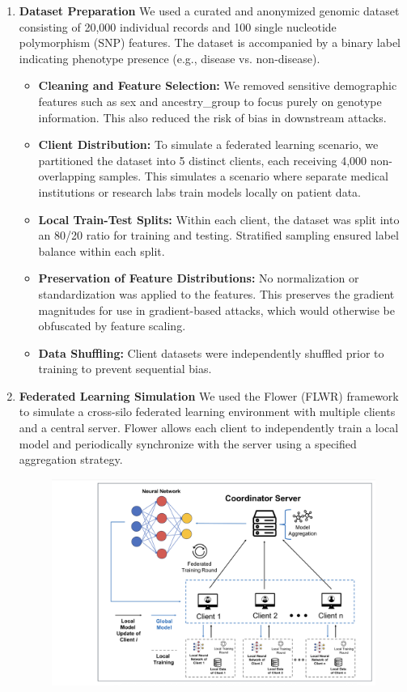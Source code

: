 \documentclass[conference]{IEEEtran}
\begin{document}
\begin{enumerate}
    \item \textbf{Dataset Preparation} 
    \newline
    We used a curated and anonymized genomic dataset consisting of 20,000 individual records and 100 single nucleotide polymorphism (SNP) features. The dataset is accompanied by a binary label indicating phenotype presence (e.g., disease vs. non-disease).
    \begin{itemize}
        \item \textbf{Cleaning and Feature Selection:} We removed sensitive demographic features such as sex and ancestry\_group to focus purely on genotype information. This also reduced the risk of bias in downstream attacks.
        \item \textbf{Client Distribution:} To simulate a federated learning scenario, we partitioned the dataset into 5 distinct clients, each receiving 4,000 non-overlapping samples. This simulates a scenario where separate medical institutions or research labs train models locally on patient data.
        \item \textbf{Local Train-Test Splits:} Within each client, the dataset was split into an 80/20 ratio for training and testing. Stratified sampling ensured label balance within each split.
        \item \textbf{Preservation of Feature Distributions:} No normalization or standardization was applied to the features. This preserves the gradient magnitudes for use in gradient-based attacks, which would otherwise be obfuscated by feature scaling.
        \item \textbf{Data Shuffling:} Client datasets were independently shuffled prior to training to prevent sequential bias.
    \end{itemize}
    \item \textbf{Federated Learning Simulation}
    \newline
    We used the Flower (FLWR) framework to simulate a cross-silo federated learning environment with multiple clients and a central server. Flower allows each client to independently train a local model and periodically synchronize with the server using a specified aggregation strategy. 
    \begin{figure}[H]
        \centering
        \includegraphics[width=\linewidth]{Federated_Learning_Architecture.png}

\end{figure}
\end{enumerate}
\end{document}

